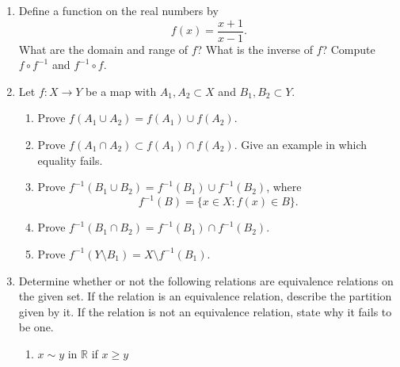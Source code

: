 {\begin{enumerate}
\begin{enumerate}
\item
If $g \circ f$ is one-to-one, show that $f$ is one-to-one.
 
\item
If $g \circ f$ is one-to-one and $f$ is onto, show that $g$ is
one-to-one.
 
\item
If $g \circ f$ is onto and $g$ is one-to-one, show that $f$ is onto.
 
\end{enumerate}
 
\item
Define a function on the real numbers by
\[
f(x) = \frac{x + 1}{x - 1}.
\]
What are the domain and range of $f$? What is the inverse of $f$?  Compute $f \circ f^{-1}$ and $f^{-1} \circ f$. 
 
\item
Let $f: X \rightarrow Y$ be a map with $A_1, A_2 \subset X$ and $B_1, B_2 \subset Y$. 
\begin{enumerate}
 
\item
Prove $f( A_1 \cup A_2 ) = f( A_1) \cup f( A_2 )$.
 
\item
Prove $f( A_1 \cap A_2 ) \subset f( A_1) \cap f( A_2 )$.  Give an example in which equality fails.
 
\item
Prove $f^{-1}( B_1 \cup B_2 ) = f^{-1}( B_1) \cup f^{-1}(B_2 )$, where
\[
f^{-1}(B) = \{ x \in X : f(x) \in B \}.
\]
 
\item
Prove $f^{-1}( B_1 \cap B_2 ) = f^{-1}( B_1) \cap f^{-1}( B_2 )$. 
 
\item
Prove $f^{-1}( Y \setminus B_1 ) = X \setminus f^{-1}( B_1)$.
 
\end{enumerate}
 
\item
Determine whether or not the following relations are equivalence relations on the given set.  If the relation is an equivalence relation, describe the partition given by it.  If the relation is not an equivalence relation, state why it fails to be one.
\begin{multicols}{2}
\begin{enumerate}
 
\item
$x \sim y$ in ${\mathbb R}$ if $x \geq y$
 

\end{enumerate}
\end{multicols}
\end{enumerate}}
